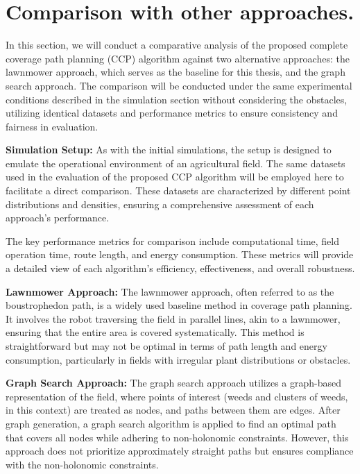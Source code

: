 
\chapter{Comparison with other approaches.}

In this section, we will conduct a comparative analysis of the proposed complete coverage path planning (CCP) algorithm against two alternative approaches: the lawnmower approach, which serves as the baseline for this thesis, and the graph search approach. The comparison will be conducted under the same experimental conditions described in the simulation section without considering the obstacles, utilizing identical datasets and performance metrics to ensure consistency and fairness in evaluation.

\vspace{3mm}   

\textbf{Simulation Setup: } As with the initial simulations, the setup is designed to emulate the operational environment of an agricultural field. The same datasets used in the evaluation of the proposed CCP algorithm will be employed here to facilitate a direct comparison. These datasets are characterized by different point distributions and densities, ensuring a comprehensive assessment of each approach’s performance.

\vspace{3mm}   

The key performance metrics for comparison include computational time, field operation time, route length, and energy consumption. These metrics will provide a detailed view of each algorithm's efficiency, effectiveness, and overall robustness.

\vspace{3mm}    

\textbf{Lawnmower Approach: }The lawnmower approach, often referred to as the boustrophedon path, is a widely used baseline method in coverage path planning. It involves the robot traversing the field in parallel lines, akin to a lawnmower, ensuring that the entire area is covered systematically. This method is straightforward but may not be optimal in terms of path length and energy consumption, particularly in fields with irregular plant distributions or obstacles.

\vspace{3mm}   

\textbf{Graph Search Approach:} The graph search approach utilizes a graph-based representation of the field, where points of interest (weeds and clusters of weeds, in this context) are treated as nodes, and paths between them are edges. After graph generation, a graph search algorithm is applied to find an optimal path that covers all nodes while adhering to non-holonomic constraints. However, this approach does not prioritize approximately straight paths but ensures compliance with the non-holonomic constraints.  



